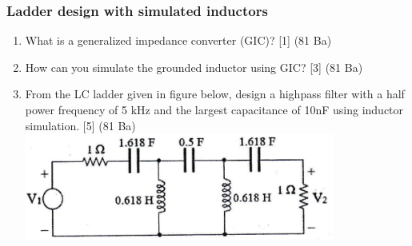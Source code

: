 \documentclass[12pt]{article}
\begin{document}
\subsubsection{Ladder design with simulated inductors}
	\begin{enumerate}[noitemsep, topsep=0pt]
		\item What is a generalized impedance converter (GIC)? \hfill [1] (81 Ba)
		
		\item How can you simulate the grounded inductor using GIC? \hfill [3] (81 Ba)
		
		\item From the LC ladder given in figure below, design a highpass filter with a half power frequency of 5 kHz and the largest capacitance of 10nF using inductor simulation. \hfill [5] (81 Ba)\\
		\includegraphics[width=4in]{fd_11}
	\end{enumerate}
\end{document}
